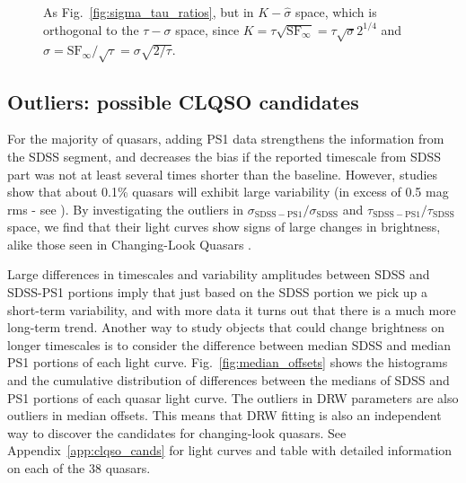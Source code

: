 \documentclass[twocolumn]{aastex62}
\begin{document}
\begin{figure*} %
\caption{As Fig.~\ref{fig:sigma_tau_ratios}, but in $K-\hat{\sigma}$ space, which is orthogonal to the $\tau-\sigma$ space, since $K = \tau \sqrt{\mathrm{SF}_{\infty}} = \tau \sqrt{\sigma} 2^{1/4}$ and $\hat{\sigma} = \mathrm{SF}_{\infty} / \sqrt{\tau} = \sigma \sqrt{2/\tau}$.
}
\label{fig:K_sigma_ratios}
\end{figure*}


\subsection{Outliers: possible CLQSO candidates}


For the majority of quasars,  adding PS1 data strengthens the information from the SDSS segment, and decreases the bias if the reported timescale from SDSS part was not at least several times shorter than the baseline. However, studies show that about 0.1\% quasars will exhibit large variability (in excess of 0.5 mag rms - see \citealt{macleod2012}). By investigating the outliers in $\sigma_{\mathrm{SDSS-PS1}} / \sigma_{\mathrm{SDSS}} $ and $\tau_{\mathrm{SDSS-PS1}} / \tau_{\mathrm{SDSS}} $ space, we find that their light curves show signs of large changes in brightness, alike those seen in Changing-Look Quasars \cite{macleod2019,ruan2019, sheng2019, frederick2019,trakhtenbrot2019,shen2019,stern2018,ross2018,lawrence2018,yang2018,gezari2017, stern2017, sheng2017, blanchard2017, ruan2016, runnoe2016, guo2016, lamassa2015,schawinski2015, elitzur2014}. 


Large differences in timescales and variability amplitudes between SDSS and SDSS-PS1 portions imply that just based on the SDSS portion we pick up a short-term variability, and with more data it turns out that there is a much more long-term trend. Another way to study objects that could change brightness on longer timescales is to consider the difference between median SDSS and median PS1 portions of each light curve. Fig.~\ref{fig:median_offsets} shows the histograms and the cumulative distribution of differences between the medians of  SDSS and PS1 portions of each quasar light curve. The outliers in DRW parameters are also outliers in median offsets. This means that DRW fitting is also an independent way to discover the candidates for changing-look  quasars.  See Appendix~\ref{app:clqso_cands} for light curves and table with detailed information on each of the 38 quasars. 
\end{document}
